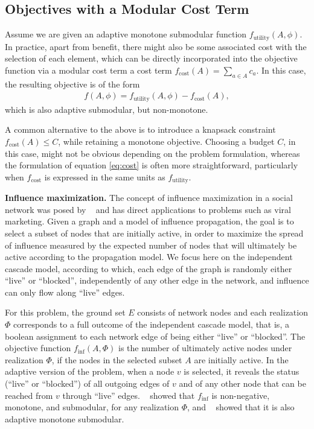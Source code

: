 \documentclass{article}
\newcommand{\citet}[1]{\citeauthor{#1}~\shortcite{#1}}
\renewcommand{\paragraph}[1]{\vspace{0.3em}\noindent\textbf{#1.}\makebox[0.5em]{}}
\begin{document}
\subsection{Objectives with a Modular Cost Term}
Assume we are given an adaptive monotone submodular function $f_{\textrm{utility}}(A, \phi)$.
In practice, apart from benefit, there might also be some associated cost with the selection of each element, which can be directly incorporated into the objective function via a modular cost term a cost term $f_{\textrm{cost}}(A) = \sum_{a \in A} c_a$.
In this case, the resulting objective is of the form
\begin{align} \label{eq:cost}
  f(A, \phi) = f_{\textrm{utility}}(A, \phi) - f_{\textrm{cost}}(A),
\end{align}
which is also adaptive submodular, but non-monotone.

A common alternative to the above is to introduce a knapsack constraint $f_{\textrm{cost}}(A) \leq C$, while retaining a monotone objective.
Choosing a budget $C$, in this case, might not be obvious depending on the problem formulation, whereas the formulation of equation \eqref{eq:cost} is often more straightforward, particularly when $f_{\textrm{cost}}$ is expressed in the same units as $f_{\textrm{utility}}$.

\paragraph{Influence maximization}
The concept of influence maximization in a social network was posed by \citet{kempe03} and has direct applications to problems such as viral marketing.
Given a graph and a model of influence propagation, the goal is to select a subset of nodes that are initially active, in order to maximize the spread of influence measured by the expected number of nodes that will ultimately be active according to the propagation model.
We focus here on the independent cascade model, according to which, each edge of the graph is randomly either ``live'' or ``blocked'', independently of any other edge in the network, and influence can only flow along ``live'' edges.

For this problem, the ground set $E$ consists of network nodes and each realization $\Phi$ corresponds to a full outcome of the independent cascade model, that is, a boolean assignment to each network edge of being either ``live'' or ``blocked''.
The objective function $f_{\textrm{inf}}(A, \Phi)$ is the number of ultimately active nodes under realization $\Phi$, if the nodes in the selected subset $A$ are initially active.
In the adaptive version of the problem, when a node $v$ is selected, it reveals the status (``live'' or ``blocked'') of all outgoing edges of $v$ and of any other node that can be reached from $v$ through ``live'' edges.
\citet{kempe03} showed that $f_{\textrm{inf}}$ is non-negative, monotone, and submodular, for any realization $\Phi$, and \citet{golovin11} showed that it is also adaptive monotone submodular.
\end{document}
